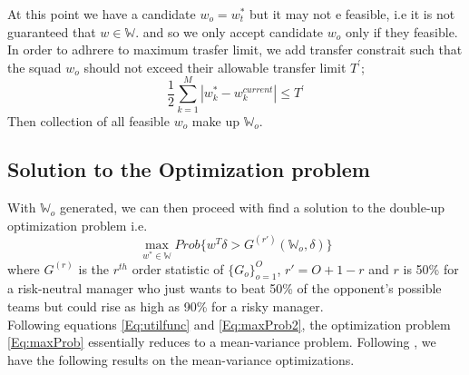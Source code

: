 				At this point we have a candidate $w_o = w^*_t$ but it may not e feasible, i.e it is not guaranteed that $w \in \mathbb{W}$. and so we only accept candidate $w_o$ only if they feasible. In order to adhrere to maximum trasfer limit, we add transfer constrait such that the squad $w_o$ should not exceed their allowable transfer limit $T^{'}$;
				$$
					\frac{1}{2} \sum_{k=1}^{M}\left| w^*_{k}-w^{current}_{k} \right| \leqslant T^{'}
				$$
				Then collection of all feasible $w_o$ make up $\mathbb{W}_o$.

				\subsection{Solution to the Optimization problem}
				With $\mathbb{W}_o$ generated, we can then proceed with find a solution to the double-up optimization problem i.e.\\
				\begin{equation}\label{Eq:maxProb}
					\max_{w^*\in\mathbb{W}}Prob\{w^T\delta > G^{(r')}(\mathbb{W}_o, \delta)\}
				\end{equation}
				where $G^{(r)}$ is the $r^{th}$ order statistic of $\{G_o\}_{o=1}^O$, $r' = O + 1 - r$ and $r$ is 50\% for a risk-neutral manager who just wants to beat 50\% of the opponent’s possible teams but could rise as high as 90\% for a risky manager.\\
				Following equations \ref{Eq:utilfunc} and \ref{Eq:maxProb2}, the optimization problem \ref{Eq:maxProb} essentially reduces to a mean-variance problem. Following \cite{morton2003optimizing}, we have the following results on the mean-variance optimizations.

